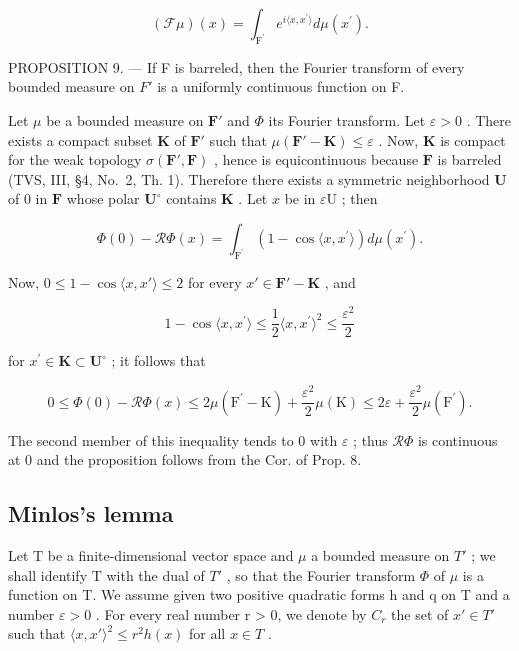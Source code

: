 \[
(\mathcal {F} \mu) (x) = \int_ {\mathrm{F} ^ {\prime}} e ^ {i \langle x, x ^ {\prime} \rangle} d \mu (x ^ {\prime}).
\]

PROPOSITION 9. --- If F is barreled, then the Fourier transform of every bounded measure on \(F'\) is a uniformly continuous function on F.

Let \(\mu\) be a bounded measure on \(\mathbf{F}'\) and \(\Phi\) its Fourier transform. Let \(\varepsilon > 0\) . There exists a compact subset \(\mathbf{K}\) of \(\mathbf{F}'\) such that \(\mu(\mathbf{F}' - \mathbf{K}) \leqslant \varepsilon\) . Now, \(\mathbf{K}\) is compact for the weak topology \(\sigma(\mathbf{F}', \mathbf{F})\) , hence is equicontinuous because \(\mathbf{F}\) is barreled (TVS, III, §4, No.~2, Th. 1). Therefore there exists a symmetric neighborhood \(\mathbf{U}\) of \(0\) in \(\mathbf{F}\) whose polar \(\mathbf{U}^{\circ}\) contains \(\mathbf{K}\) . Let \(x\) be in \(\varepsilon \mathrm{U}\) ; then

\[
\Phi (0) - \mathcal {R} \Phi (x) = \int_ {\mathrm{F} ^ {\prime}} \left(1 - \cos \langle x, x ^ {\prime} \rangle\right) d \mu (x ^ {\prime}).
\]

Now, \(0 \leqslant 1 - \cos \langle x, x' \rangle \leqslant 2\) for every \(x' \in \mathbf{F}' - \mathbf{K}\) , and

\[
1 - \cos \langle x, x ^ {\prime} \rangle \leqslant \frac {1}{2} \langle x, x ^ {\prime} \rangle^ {2} \leqslant \frac {\varepsilon^ {2}}{2}
\]

for \(x^{\prime}\in \mathbf{K}\subset \mathbf{U}^{\circ}\) ; it follows that

\[
0 \leqslant \Phi (0) - \mathcal {R} \Phi (x) \leqslant 2 \mu (\mathrm{F} ^ {\prime} - \mathrm{K}) + \frac {\varepsilon^ {2}}{2} \mu (\mathrm{K}) \leqslant 2 \varepsilon + \frac {\varepsilon^ {2}}{2} \mu (\mathrm{F} ^ {\prime}).
\]

The second member of this inequality tends to 0 with \(\varepsilon\) ; thus \(\mathcal{R}\Phi\) is continuous at 0 and the proposition follows from the Cor. of Prop. 8.

\subsection{Minlos's lemma}

Let T be a finite-dimensional vector space and \(\mu\) a bounded measure on \(T'\) ; we shall identify T with the dual of \(T'\) , so that the Fourier transform \(\Phi\) of \(\mu\) is a function on T. We assume given two positive quadratic forms h and q on T and a number \(\varepsilon > 0\) . For every real number r > 0, we denote by \(C_{r}\) the set of \(x' \in T'\) such that \(\langle x, x' \rangle^{2} \leqslant r^{2} h(x)\) for all \(x \in T\) .

